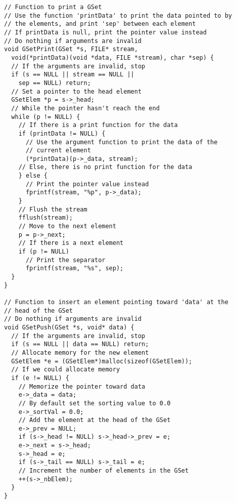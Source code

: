 \documentclass[12pt, a4paper]{article}
\begin{document}
\begin{scriptsize}
\begin{ttfamily}
\begin{lstlisting}
// Function to print a GSet
// Use the function 'printData' to print the data pointed to by 
// the elements, and print 'sep' between each element
// If printData is null, print the pointer value instead
// Do nothing if arguments are invalid
void GSetPrint(GSet *s, FILE* stream, 
  void(*printData)(void *data, FILE *stream), char *sep) {
  // If the arguments are invalid, stop
  if (s == NULL || stream == NULL || 
    sep == NULL) return;
  // Set a pointer to the head element
  GSetElem *p = s->_head;
  // While the pointer hasn't reach the end
  while (p != NULL) {
    // If there is a print function for the data
    if (printData != NULL) {
      // Use the argument function to print the data of the 
      // current element
      (*printData)(p->_data, stream);
    // Else, there is no print function for the data
    } else {
      // Print the pointer value instead
      fprintf(stream, "%p", p->_data);
    }
    // Flush the stream
    fflush(stream);
    // Move to the next element
    p = p->_next;
    // If there is a next element
    if (p != NULL)
      // Print the separator
      fprintf(stream, "%s", sep);
  }
}

// Function to insert an element pointing toward 'data' at the 
// head of the GSet
// Do nothing if arguments are invalid
void GSetPush(GSet *s, void* data) {
  // If the arguments are invalid, stop
  if (s == NULL || data == NULL) return;
  // Allocate memory for the new element
  GSetElem *e = (GSetElem*)malloc(sizeof(GSetElem));
  // If we could allocate memory
  if (e != NULL) {
    // Memorize the pointer toward data
    e->_data = data;
    // By default set the sorting value to 0.0
    e->_sortVal = 0.0;
    // Add the element at the head of the GSet 
    e->_prev = NULL;
    if (s->_head != NULL) s->_head->_prev = e;
    e->_next = s->_head;
    s->_head = e;
    if (s->_tail == NULL) s->_tail = e;
    // Increment the number of elements in the GSet
    ++(s->_nbElem);
  }
}


\end{lstlisting}
\end{ttfamily}
\end{scriptsize}
\end{document}
